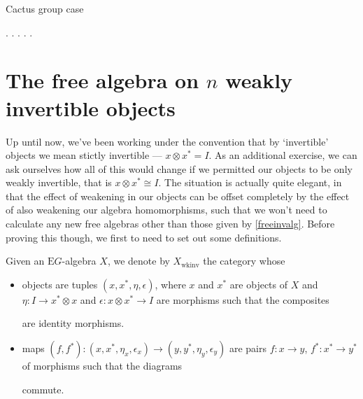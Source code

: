 \begin{prop} Cactus group case
\end{prop}

.
.
.
.
.


\section{The free algebra on $n$ weakly invertible objects}

Up until now, we've been working under the convention that by `invertible' objects we mean stictly invertible --- $x \otimes x^* = I$. As an additional exercise, we can ask ourselves how all of this would change if we permitted our objects to be only weakly invertible, that is $x \otimes x^* \cong I$. The situation is actually quite elegant, in that the effect of weakening in our objects can be offset completely by the effect of also weakening our algebra homomorphisms, such that we won't need to calculate any new free algebras other than those given by \cref{freeinvalg}. Before proving this though, we first to need to set out some definitions.

\begin{defn} Given an $\mathrm{E}G$-algebra $X$, we denote by $X_{\mathrm{wkinv}}$ the category whose
\begin{itemize}
\item objects are tuples $(x, x^*, \eta, \epsilon)$, where $x$ and $x^*$ are objects of $X$ and $\eta: I \to x^* \otimes x$ and $\epsilon : x \otimes x^* \to I$ are morphisms such that the composites
\begin{eq*}  \end{eq*}
are identity morphisms.
\item maps $(f, f^*): (x, x^*, \eta_x, \epsilon_x) \to (y, y^*, \eta_y, \epsilon_y)$ are pairs $f: x \to y$, $f^* : x^* \to y^*$ of morphisms such that the diagrams
\begin{eq*}  \end{eq*}
commute.
\end{itemize}
\end{defn}

